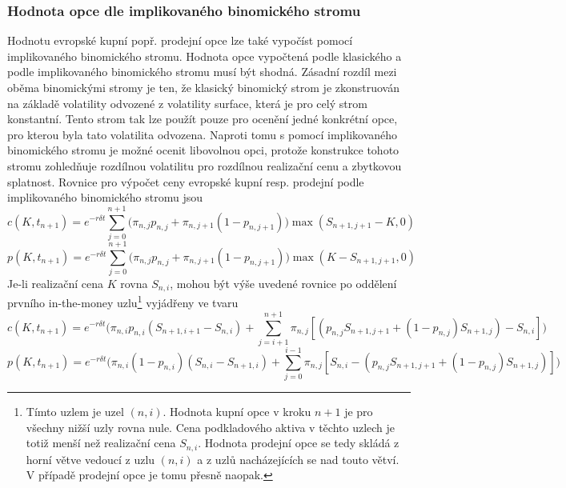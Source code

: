\documentclass[a4paper]{book}
\begin{document}
\subsubsection{Hodnota opce dle implikovaného binomického stromu}

Hodnotu evropské kupní popř. prodejní opce lze také vypočíst pomocí implikovaného binomického stromu. Hodnota opce vypočtená podle klasického a podle implikovaného binomického stromu musí být shodná. Zásadní rozdíl mezi oběma binomickými stromy je ten, že klasický binomický strom je zkonstruován na základě volatility odvozené z volatility surface, která je pro celý strom konstantní. Tento strom tak lze použít pouze pro ocenění jedné konkrétní opce, pro kterou byla tato volatilita odvozena. Naproti tomu s pomocí implikovaného binomického stromu je možné ocenit libovolnou opci, protože konstrukce tohoto stromu zohledňuje rozdílnou volatilitu pro rozdílnou realizační cenu a zbytkovou splatnost. Rovnice pro výpočet ceny evropské kupní resp. prodejní podle implikovaného binomického stromu jsou
\begin{equation*}
c(K, t_{n+1}) = e^{-r \delta t} \sum_{j=0}^{n+1}\bigg(\pi_{n,j}p_{n,j}+\pi_{n, j + 1}(1-p_{n,j+1})\bigg)\max(S_{n+1,j+1}-K,0)
\end{equation*} 
\begin{equation*}
p(K, t_{n+1}) = e^{-r \delta t} \sum_{j=0}^{n+1}\bigg(\pi_{n,j}p_{n,j}+\pi_{n, j + 1}(1-p_{n,j+1})\bigg)\max(K-S_{n+1,j+1},0)
\end{equation*}
Je-li realizační cena $K$ rovna $S_{n,i}$, mohou být výše uvedené rovnice po oddělení prvního in-the-money uzlu\footnote{Tímto uzlem je uzel $(n,i)$. Hodnota kupní opce v kroku $n+1$ je pro všechny nižší uzly rovna nule. Cena podkladového aktiva v těchto uzlech je totiž menší než realizační cena $S_{n,i}$. Hodnota prodejní opce se tedy skládá z horní větve vedoucí z uzlu $(n,i)$ a z uzlů nacházejících se nad touto větví. V případě prodejní opce je tomu přesně naopak.} vyjádřeny ve tvaru
\begin{equation*}
c(K, t_{n+1}) = e^{-r \delta t} \bigg( \pi_{n,i}p_{n,i}(S_{n+1,i+1}-S_{n,i}) + \sum_{j=i+1}^{n+1}\pi_{n,j}[(p_{n,j}S_{n+1,j+1}+ (1-p_{n,j})S_{n+1,j})-S_{n,i}] \bigg)
\end{equation*}
\begin{equation*}
p(K, t_{n+1}) = e^{-r \delta t} \bigg( \pi_{n,i}(1-p_{n,i})(S_{n,i}-S_{n+1,i}) + \sum_{j=0}^{i-1}\pi_{n,j}[S_{n,i}-(p_{n,j}S_{n+1,j+1}+ (1-p_{n,j})S_{n+1,j})] \bigg)
\end{equation*}
\end{document}
